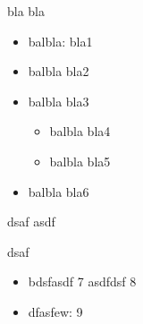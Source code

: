bla bla 

\begin{itemize}
	\item balbla: bla1
	\item balbla bla2
	\item balbla bla3
	\begin{itemize}
		\item balbla bla4
		\item balbla bla5
	\end{itemize}
	\item balbla bla6
\end{itemize}
dsaf
asdf

dsaf

\begin{itemize}
	\item bdsfasdf 7
	asdfdsf 8
	\item dfasfew: 9
\end{itemize}